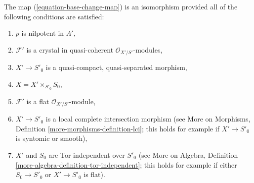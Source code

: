 \begin{remark}
\label{remark-base-change-isomorphism}
The map (\ref{equation-base-change-map}) is an isomorphism provided
all of the following conditions are satisfied:
\begin{enumerate}
\item $p$ is nilpotent in $A'$,
\item $\mathcal{F}'$ is a crystal in quasi-coherent
$\mathcal{O}_{X'/S'}$-modules,
\item $X' \to S'_0$ is a quasi-compact, quasi-separated morphism,
\item $X = X' \times_{S'_0} S_0$,
\item $\mathcal{F}'$ is a flat $\mathcal{O}_{X'/S'}$-module,
\item $X' \to S'_0$ is a local complete intersection morphism (see
More on Morphisms, Definition \ref{more-morphisms-definition-lci}; this
holds for example if $X' \to S'_0$ is syntomic or smooth),
\item $X'$ and $S_0$ are Tor independent over $S'_0$ (see
More on Algebra, Definition \ref{more-algebra-definition-tor-independent};
this holds for example if either $S_0 \to S'_0$ or $X' \to S'_0$ is flat).
\end{enumerate}


\end{remark}
